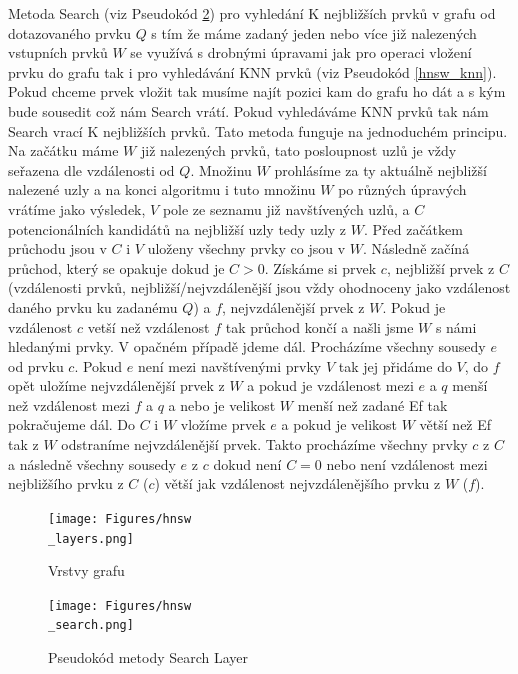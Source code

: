 \documentclass[czech,semestral,dept460,male,csharp,cpdeclaration]{diploma}
\begin{document}
		\label{MS}
		Metoda Search (viz Pseudokód \ref{hnsw_search}) pro vyhledání K nejbližších prvků v grafu od dotazovaného prvku $Q$ s tím že máme zadaný jeden nebo více již nalezených vstupních prvků $W$ se využívá s drobnými úpravami jak pro operaci vložení prvku do grafu tak i pro vyhledávání KNN prvků (viz Pseudokód \ref{hnsw_knn}). Pokud chceme prvek vložit tak musíme najít pozici kam do grafu ho dát a s kým bude sousedit což nám Search vrátí. Pokud vyhledáváme KNN prvků tak nám Search vrací K nejbližších prvků. Tato metoda funguje na jednoduchém principu. Na začátku máme $W$ již nalezených prvků, tato posloupnost uzlů je vždy seřazena dle vzdálenosti od $Q$. Množinu $W$ prohlásíme za ty aktuálně nejbližší nalezené uzly a na konci algoritmu i tuto množinu $W$ po různých úpravých vrátíme jako výsledek, $V$ pole ze seznamu již navštívených uzlů, a $C$ potencionálních kandidátů na nejbližší uzly tedy uzly z $W$. Před začátkem průchodu jsou v $C$ i $V$ uloženy všechny prvky co jsou v $W$. Následně začíná průchod, který se opakuje dokud je $C > 0$. Získáme si prvek $c$, nejbližší prvek z $C$ (vzdálenosti prvků, nejbližší/nejvzdálenější jsou vždy ohodnoceny jako vzdálenost daného prvku ku zadanému $Q$) a $f$, nejvzdálenější prvek z $W$. Pokud je vzdálenost $c$ vetší než vzdálenost $f$ tak průchod končí a našli jsme $W$ s námi hledanými prvky. V opačném případě jdeme dál. Procházíme všechny sousedy $e$ od prvku $c$. Pokud $e$ není mezi navštívenými prvky $V$ tak jej přidáme do $V$, do $f$ opět uložíme nejvzdálenější prvek z $W$ a pokud je vzdálenost mezi $e$ a $q$ menší než vzdálenost mezi $f$ a $q$ a nebo je velikost $W$ menší než zadané Ef tak pokračujeme dál. Do $C$ i $W$ vložíme prvek $e$ a pokud je velikost $W$ větší než Ef tak z $W$ odstraníme nejvzdálenější prvek. Takto procházíme všechny prvky $c$ z $C$ a následně všechny sousedy $e$ z $c$ dokud není $C = 0$ nebo není vzdálenost mezi nejbližšího prvku z $C$ ($c$) větší jak vzdálenost nejvzdálenějšího prvku z $W$ ($f$).
		
		\begin{figure}
			\centering
			\texttt{[image: Figures/hnsw\\\_layers.png]}
			\caption{Vrstvy grafu}
			\label{hnsw_layers}
		\end{figure}
		
		\begin{figure}
			\centering
			\texttt{[image: Figures/hnsw\\\_search.png]}
			\caption{Pseudokód metody Search Layer}
			\label{hnsw_search}
		\end{figure}
		
\end{document}
